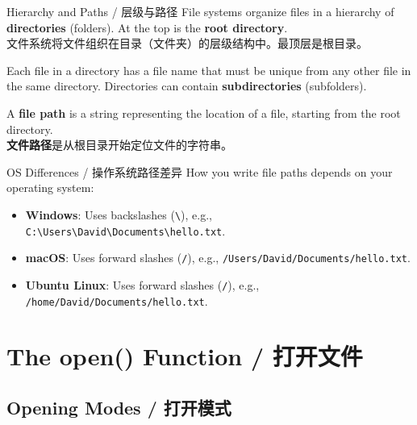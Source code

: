 \documentclass[11pt,a4paper]{report}
\let\oldtexttt\texttt
\renewcommand{\texttt}[1]{\textcolor{mainblue}{\oldtexttt{#1}}}
\begin{document}
\begin{concept}{Hierarchy and Paths / 层级与路径}
    File systems organize files in a hierarchy of \textbf{directories} (folders). At the top is the \textbf{root directory}. \\
    文件系统将文件组织在目录（文件夹）的层级结构中。最顶层是根目录。

    Each file in a directory has a file name that must be unique from any other file in the same directory. Directories can contain \textbf{subdirectories} (subfolders).

    A \textbf{file path} is a string representing the location of a file, starting from the root directory. \\
    \textbf{文件路径}是从根目录开始定位文件的字符串。
\end{concept}

\begin{warning}{OS Differences / 操作系统路径差异}
    How you write file paths depends on your operating system:
    \begin{itemize}
        \item \textbf{Windows}: Uses backslashes (\texttt{\textbackslash}), e.g., \texttt{C:\textbackslash Users\textbackslash David\textbackslash Documents\textbackslash hello.txt}.
        \item \textbf{macOS}: Uses forward slashes (\texttt{/}), e.g., \texttt{/Users/David/Documents/hello.txt}.
        \item \textbf{Ubuntu Linux}: Uses forward slashes (\texttt{/}), e.g., \texttt{/home/David/Documents/hello.txt}.
    \end{itemize}
\end{warning}

\section{The open() Function / 打开文件}

\subsection{Opening Modes / 打开模式}
\end{document}
